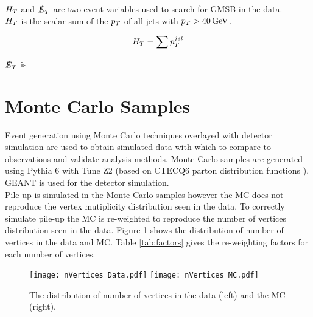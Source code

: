 $H_{T}$ and $\slashed{E}_{T}$ are two event variables used to search for GMSB in the data. \\ 

$H_{T}$ is the scalar sum of the $p_{T}$ of all jets with $p_{T} > 40\, \mathrm{GeV}$.

\begin{equation}
H_{T} = \sum p_{T}^{jet}
\end{equation}

$\slashed{E}_{T}$ is 

\section{Monte Carlo Samples}
\label{sec:Monte_Carlo_Samples}

Event generation using Monte Carlo techniques overlayed with detector simulation
are used to obtain simulated data with which to compare to observations and
validate analysis methods. Monte Carlo samples are generated using Pythia 6 
\cite{pythia6} with Tune Z2 (based on CTECQ6 parton distribution functions 
\cite{tuneZ2}). GEANT \cite{geant} is used for the detector simulation. \\

Pile-up is simulated in the Monte Carlo samples however the MC does not
reproduce the vertex mutiplicity distribution seen in the data. To correctly
simulate pile-up the MC is re-weighted to reproduce the number of vertices
distribution seen in the data. Figure \ref{fig:nVertices} shows the distribution
of number of vertices in the data and MC. Table \ref{tab:factors} gives the 
re-weighting factors for each number of vertices. \\

\begin{figure}
\texttt{[image: nVertices\_Data.pdf]}
\texttt{[image: nVertices\_MC.pdf]}
\caption{The distribution of number of vertices in the data (left) and the MC
(right).}
\label{fig:nVertices}
\end{figure}


